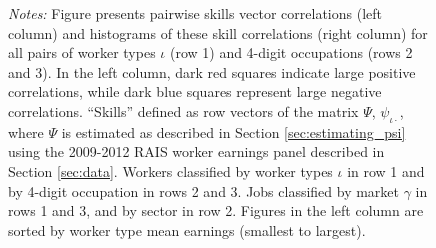 \documentclass[12pt]{article}
\def\g{\gamma}
\def\i{\iota}
\theoremstyle{definition}
\theoremstyle{plain}
\begin{document}
\begin{figure}[!htbp]
\begin{subfigure}[b]{\w\textwidth}
		\label{fig:correlograms_hist_occ4_first_recode_gamma_sorted}
	\end{subfigure}
	\label{fig:correlograms_sorted}
	\flushleft\footnotesize \emph{Notes:} Figure presents pairwise skills vector correlations (left column) and histograms of these skill correlations (right column) for all pairs of worker types $\i$ (row 1) and 4-digit occupations (rows 2 and 3). In the left column, dark red squares indicate large positive correlations, while dark blue squares represent large negative correlations. ``Skills'' defined as row vectors of the matrix $\Psi$, $\psi_{\i\cdot}$, where $\Psi$ is estimated as described in Section \ref{sec:estimating_psi} using the 2009-2012 RAIS worker earnings panel described in Section \ref{sec:data}. Workers classified by worker types $\i$ in row 1 and by 4-digit occupation in rows 2 and 3. Jobs classified by market $\g$ in rows 1 and 3, and by sector in row 2. Figures in the left column are sorted by worker type mean earnings (smallest to largest).
\end{figure}
\end{document}
